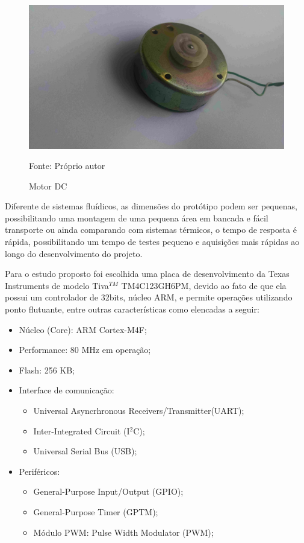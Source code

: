 \begin{figure}[!htb]
\caption{Motor DC}
\center\includegraphics[scale=0.1, angle=0, clip=true, trim=1500 500 400 200]
{./imagens/motorDC.jpg}
\label{fig:motor DC}

{\small Fonte: Próprio autor}
\end{figure}

Diferente de sistemas fluídicos, as dimensões do protótipo podem ser pequenas, possibilitando uma montagem de uma pequena área em bancada e fácil transporte ou ainda comparando com sistemas térmicos, o tempo de resposta é rápida, possibilitando um tempo de testes pequeno e aquisições mais rápidas ao longo do desenvolvimento do projeto.






Para o estudo proposto foi escolhida uma placa de desenvolvimento da Texas Instruments de modelo Tiva$^{TM}$ TM4C123GH6PM, devido ao fato de que ela possui um controlador de 32bits, núcleo ARM, e permite operações utilizando ponto flutuante, entre outras características como elencadas a seguir:

\begin{itemize}
\item Núcleo (Core): ARM Cortex-M4F;
\item Performance: 80 MHz em operação;
\item Flash: 256 KB;
\item Interface de comunicação:
	\begin{itemize}
	\item  Universal Asyncrhronous Receivers/Transmitter(UART);
  	\item Inter-Integrated Circuit (I$^2$C);
	\item Universal Serial Bus (USB);
	\end{itemize}
\item Periféricos:
	\begin{itemize}
	\item General-Purpose Input/Output (GPIO);
	\item General-Purpose Timer (GPTM);
	\item Módulo PWM: Pulse Width Modulator (PWM);
	\end{itemize}
\end{itemize}


